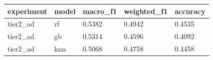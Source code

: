 \begin{tabular}{lllll}
\toprule
experiment & model & macro\_f1 & weighted\_f1 & accuracy \\
\midrule
  tier2\_ad &    rf &   0.5382 &      0.4942 &   0.4535 \\
  tier2\_ad &    gb &   0.5314 &      0.4596 &   0.4092 \\
  tier2\_ad &   knn &   0.5068 &      0.4758 &   0.4458 \\
\bottomrule
\end{tabular}
